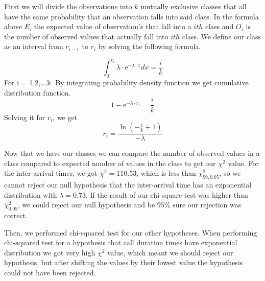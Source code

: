 \documentclass[12pt,a4paper]{article}
\begin{document}
First we will divide the observations into $k$ mutually exclusive classes that all have the same probability that an observation falls into said class. In the formula above $E_i$ the expected value of observation's that fall into a $ith$ class and $O_i$ is the number of observed values that actually fall into $ith$ class. We define our class as an interval from $r_{i-1}$ to $r_i$ by solving the following formula.

\begin{equation} \int_{0}^{r_i}\lambda\cdot\mathrm{e}^{-\lambda\cdot x}dx = \frac{i}{k} \end{equation}
For i = 1,2,…,k. By integrating probability density function we get cumulative distribution function.
\begin{equation} 1 - \mathrm{e}^{-\lambda\cdot r_i} = \frac{i}{k} \end{equation}
Solving it for $r_i$, we get
\begin{equation} r_i = \frac{\ln(-\frac{i}{k} + 1)}{-\lambda} \end{equation}

Now that we have our classes we can compare the number of observed values in a class compared to expected number of values in the class to get our $\chi^2$ value. For the inter-arrival times, we got $\chi^2=110.53$, which is less than $\chi^2_{99, 0.05}$, so we cannot reject our null hypothesis that the inter-arrival time has an exponential distribution with $\lambda=0.73$. If the result of our chi-square test was higher than $\chi^2_{0.05}$, we could reject our null hypothesis and be $95\%$ sure our rejection was correct.
\par \medskip
Then, we performed chi-squared test for our other hypotheses. When performing chi-squared test for a hypothesis that call duration times have exponential distribution we got very high $\chi^2$ value, which meant we should reject our hypothesis, but after shifting the values by their lowest value the hypothesis could not have been rejected.
\end{document}

